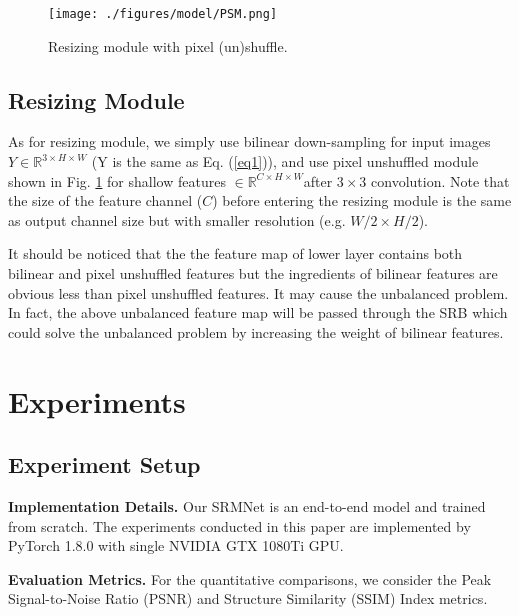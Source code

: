 \documentclass{article}
\begin{document}
\begin{figure}[htbp] 
	\centering
	\texttt{[image: ./figures/model/PSM.png]}
  \caption{Resizing module with pixel (un)shuffle.}
  \label{PSM}
\end{figure}

\subsection{Resizing Module}
As for resizing module, we simply use bilinear down-sampling for input images $Y \in \mathbb{R}^{3 \times H \times W}$ (Y is the same as Eq. (\ref{eq1})), and use pixel unshuffled module shown in Fig. \ref{PSM} for shallow features $\in \mathbb{R}^{C \times H \times W}$after $3 \times 3$ convolution. Note that the size of the feature channel ($C$) before entering the resizing module is the same as output channel size but with smaller resolution (e.g. $W/2 \times H/2$). 

It should be noticed that the the feature map of lower layer contains both bilinear and pixel unshuffled features but the ingredients of bilinear features are obvious less than pixel unshuffled features. It may cause the unbalanced problem. In fact, the above unbalanced feature map will be passed through the SRB which could solve the unbalanced problem by increasing the weight of bilinear features. 

\section{Experiments}

\subsection{Experiment Setup}
\noindent\textbf{Implementation Details.} Our SRMNet is an end-to-end model and trained from scratch. The experiments conducted in this paper are implemented by PyTorch 1.8.0 with single NVIDIA GTX 1080Ti GPU.

\noindent\textbf{Evaluation Metrics.} For the quantitative comparisons, we consider the Peak Signal-to-Noise Ratio (PSNR) and Structure Similarity (SSIM) Index metrics.
\end{document}
